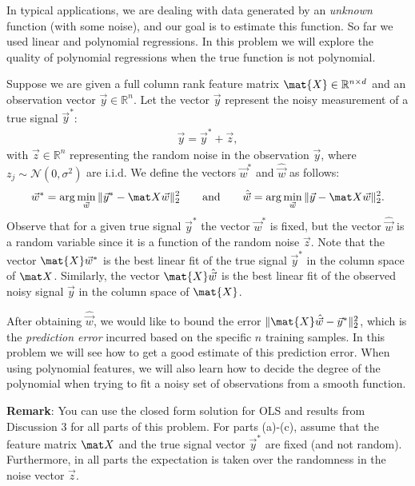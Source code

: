 \documentclass[preview]{standalone}
\begin{document}

In typical applications, we are dealing with data generated by an \emph{unknown}
function (with some noise), and our goal is to estimate this function.
So far we used linear and polynomial regressions.
In this problem we will explore the quality of polynomial regressions
when the true function is not polynomial.

Suppose we are given a full column rank feature matrix
$\mat{X} \in \mathbb{R}^{n \times d}$ and an observation vector
$\vec{y}\in \mathbb{R}^n$.
Let the vector $\vec y$ represent the noisy measurement of a true signal $\vec{y}^*$:
\begin{align}
  \vec{y} = {\vec{y}^*} + \vec{z},
  \label{eq:model}
\end{align}
with $\vec{z} \in \mathbb{R}^n$ representing the random noise in the observation $\vec{y}$,
where $z_j \sim \mathcal{N}(0,\sigma^2)$ are i.i.d.
We define the vectors $\vec{w}^*$ and $\hat{\vec{w}}$ as follows:
\begin{align*}
  \vec{w}^* = \arg\min_{\vec w} \| \vec y^* - \mat X \vec w \|_2^2\quad\quad\text{and}\quad\quad
  \hat{\vec w} = \arg\min_{\vec w} \| \vec{y} - \mat X \vec w\|_2^2.
\end{align*}
Observe that for a given true signal $\vec{y}^*$ the vector $\vec{w}^*$ is fixed,
but the vector $\hat{\vec w}$ is a random variable since it is a function of the
random noise $\vec z$.
Note that the vector $\mat{X}\vec{w}^*$ is the best linear fit of the true signal $\vec{y}^*$
in the column space of $\mat X$.
Similarly, the vector $\mat{X} \hat{\vec{w}}$ is the best
linear fit of the observed noisy signal $\vec{y}$ in the column space of $\mat {X}$.

After obtaining $\hat{\vec{w}}$, we would like to bound the error
$\| \mat{X} \hat{\vec{w}} - \vec{y}^*\|_2^2$, which is the \emph{prediction error}
incurred based on the specific $n$ training samples.
In this problem we will see how to get a good estimate of this prediction error.
When using polynomial features, we will also learn how to decide the degree of
the polynomial when trying to fit a noisy set of observations from a smooth function.

{\bf Remark}:
You can use the closed form solution for OLS and results from Discussion 3 for
all parts of this problem.
For parts (a)-(c), assume that the feature matrix $\mat X$
and the true signal vector $\vec{y}^*$ are fixed (and not random).
Furthermore, in all parts the expectation is taken over the randomness in the noise vector 
$\vec{z}$. 
\end{document}
